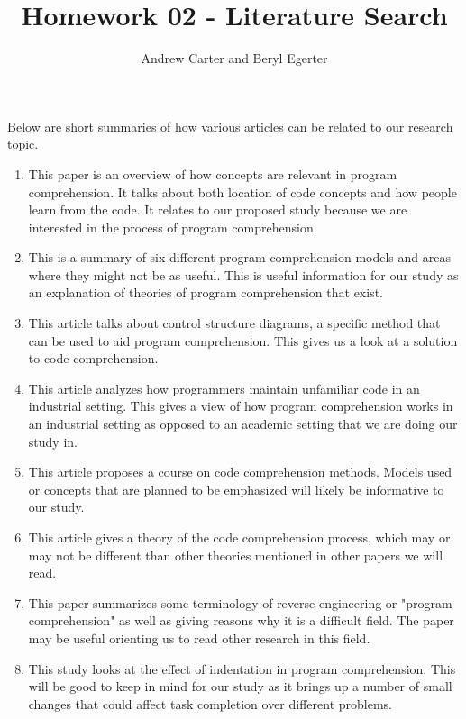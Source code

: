 \documentclass{article}
\title{Homework 02 - Literature Search}
\author{Andrew Carter and Beryl Egerter}
\begin{document}
\maketitle

Below are short summaries of how various articles can be related to our research topic.

\begin{enumerate}
\item This paper is an overview of how concepts are relevant in program comprehension. It talks about both location of code concepts and how people learn from the code. It relates to our proposed study because we are interested in the process of program comprehension. \cite{1021348}

\item This is a summary of six different program comprehension models and areas where they might not be as useful. This is useful information for our study as an explanation of theories of program comprehension that exist. \cite{402076}

\item This article talks about control structure diagrams, a specific method that can be used to aid program comprehension. This gives us a look at a solution to code comprehension. \cite{1000450}

\item This article analyzes how programmers maintain unfamiliar code in an industrial setting. This gives a view of how program comprehension works in an industrial setting as opposed to an academic setting that we are doing our study in. \cite{469502}

\item This article proposes a course on code comprehension methods. Models used or concepts that are planned to be emphasized will likely be informative to our study. \cite{1562886}

\item This article gives a theory of the code comprehension process, which may or may not be different than other theories mentioned in other papers we will read. \cite{Brooks1983543}

\item This paper summarizes some terminology of reverse engineering or "program comprehension" as well as giving reasons why it is a difficult field. The paper may be useful orienting us to read other research in this field. \cite{DBLP:journals/corr/abs-cs-0503068}

\item This study looks at the effect of indentation in program comprehension. This will be good to keep in mind for our study as it brings up a number of small changes that could affect task completion over different problems. \cite{Miara:1983:PIC:182.358437}


\end{enumerate}
\end{document}
